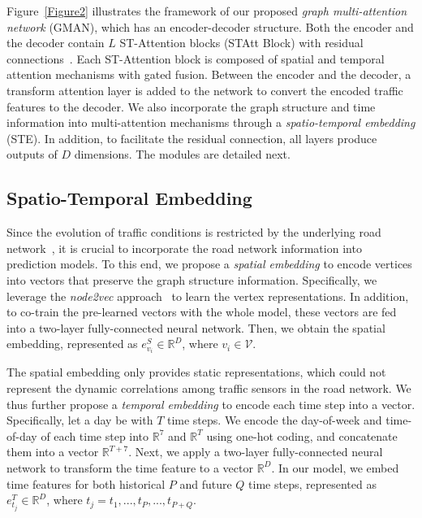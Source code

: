 \documentclass[letterpaper]{article} \usepackage{aaai20}  \usepackage{times}  \usepackage{helvet} \usepackage{courier}  \usepackage[hyphens]{url}  \usepackage{graphicx} \usepackage{amsmath}
\begin{document}
Figure~\ref{Figure2} illustrates the framework of our proposed \textit{graph multi-attention network} (GMAN), which has an encoder-decoder structure. Both the encoder and the decoder contain $ L $ ST-Attention blocks (STAtt Block) with residual connections~\cite{He-et-al:CVPR2016}. Each ST-Attention block is composed of spatial and temporal attention mechanisms with gated fusion. Between the encoder and the decoder, a transform attention layer is added to the network to convert the encoded traffic features to the decoder. We also incorporate the graph structure and time information into multi-attention mechanisms through a \textit{spatio-temporal embedding} (STE). In addition, to facilitate the residual connection, all layers produce outputs of $ D $ dimensions. The modules are detailed next.

\subsection{Spatio-Temporal Embedding}

Since the evolution of traffic conditions is restricted by the underlying road network~\cite{Lv-et-al:IJCAI2018}, it is crucial to incorporate the road network information into prediction models. To this end, we propose a \textit{spatial embedding} to encode vertices into vectors that preserve the graph structure information. Specifically, we leverage the \textit{node2vec} approach~\cite{Grover-and-Leskovec:KDD2016} to learn the vertex representations. In addition, to co-train the pre-learned vectors with the whole model, these vectors are fed into a two-layer fully-connected neural network. Then, we obtain the spatial embedding, represented as $ e^{S}_{v_i} \in \mathbb{R}^D $, where $ v_i \in \mathcal{V} $.

The spatial embedding only provides static representations, which could not represent the dynamic correlations among traffic sensors in the road network. We thus further propose a \textit{temporal embedding} to encode each time step into a vector. Specifically, let a day be with $ T $ time steps. We encode the day-of-week and time-of-day of each time step into $ \mathbb{R}^{7} $ and $ \mathbb{R}^{T} $ using one-hot coding, and concatenate them into a vector $ \mathbb{R}^{T+7} $. Next, we apply a two-layer fully-connected neural network to transform the time feature to a vector $ \mathbb{R}^{D} $. In our model, we embed time features for both historical $ P $ and future $ Q $ time steps, represented as $ e^{T}_{t_j} \in \mathbb{R}^D $, where $ t_j=t_1,...,t_P,...,t_{P+Q} $.
\end{document}
